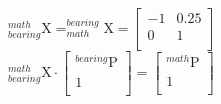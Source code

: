 \documentclass[12pt,fleqn]{standalone}
\begin{document}
\begin{preview}
\Large
${\displaystyle _{bearing}^{math}\textrm{X}=_{math}^{bearing}\textrm{X}=
\begin{bmatrix}
-1 & 0.25 \\
0 & 1 \\
\end{bmatrix}}
$\\
${\displaystyle _{bearing}^{math}\textrm{X} \cdot \begin{bmatrix}
		_{}^{bearing}\textrm{P} \\
		1 \\
	\end{bmatrix}=\begin{bmatrix}
		_{}^{math}\textrm{P} \\
		1 \\
\end{bmatrix}}$
\end{preview}
\end{document}
